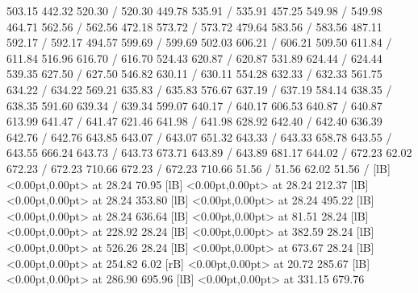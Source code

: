 { 503.15 442.32 520.30 /
 520.30 449.78 535.91 /
 535.91 457.25 549.98 /
 549.98 464.71 562.56 /
 562.56 472.18 573.72 /
 573.72 479.64 583.56 /
 583.56 487.11 592.17 /
 592.17 494.57 599.69 /
 599.69 502.03 606.21 /
 606.21 509.50 611.84 /
 611.84 516.96 616.70 /
 616.70 524.43 620.87 /
 620.87 531.89 624.44 /
 624.44 539.35 627.50 /
 627.50 546.82 630.11 /
 630.11 554.28 632.33 /
 632.33 561.75 634.22 /
 634.22 569.21 635.83 /
 635.83 576.67 637.19 /
 637.19 584.14 638.35 /
 638.35 591.60 639.34 /
 639.34 599.07 640.17 /
 640.17 606.53 640.87 /
 640.87 613.99 641.47 /
 641.47 621.46 641.98 /
 641.98 628.92 642.40 /
 642.40 636.39 642.76 /
 642.76 643.85 643.07 /
 643.07 651.32 643.33 /
 643.33 658.78 643.55 /
 643.55 666.24 643.73 /
 643.73 673.71 643.89 /
 643.89 681.17 644.02 /
\setsolid
{} 672.23 62.02 672.23 /
 672.23 710.66 672.23 /
 672.23 710.66 51.56 /
 51.56 62.02 51.56 /
  [lB] <0.00pt,0.00pt> at 28.24 70.95
  [lB] <0.00pt,0.00pt> at 28.24 212.37
  [lB] <0.00pt,0.00pt> at 28.24 353.80
  [lB] <0.00pt,0.00pt> at 28.24 495.22
  [lB] <0.00pt,0.00pt> at 28.24 636.64
  [lB] <0.00pt,0.00pt> at 81.51 28.24
  [lB] <0.00pt,0.00pt> at 228.92 28.24
  [lB] <0.00pt,0.00pt> at 382.59 28.24
  [lB] <0.00pt,0.00pt> at 526.26 28.24
  [lB] <0.00pt,0.00pt> at 673.67 28.24
  [lB] <0.00pt,0.00pt> at 254.82 6.02
 [rB] <0.00pt,0.00pt> at 20.72 285.67
  [lB] <0.00pt,0.00pt> at 286.90 695.96
  [lB] <0.00pt,0.00pt> at 331.15 679.76
\endpicture
}
